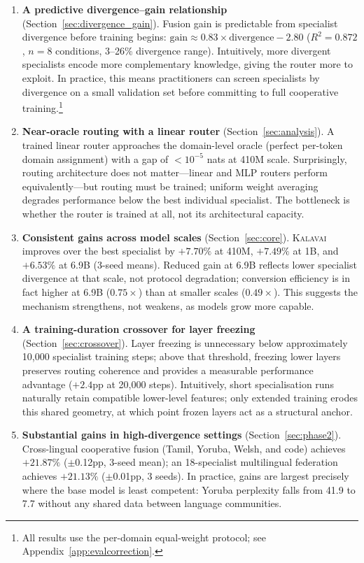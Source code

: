 \documentclass{article}
\newcommand{\kalavai}{\textsc{Kalavai}\xspace}
\begin{document}
\begin{enumerate}[leftmargin=*, itemsep=2pt]
\item \textbf{A predictive divergence--gain relationship} (Section~\ref{sec:divergence_gain}).
Fusion gain is predictable from specialist divergence before training begins:
$\text{gain} \approx 0.83 \times \text{divergence} - 2.80$
($R^2 = 0.872$, $n{=}8$ conditions, 3--26\% divergence range).
Intuitively, more divergent specialists encode more complementary knowledge,
giving the router more to exploit. In practice, this means practitioners can
screen specialists by divergence on a small validation set before committing
to full cooperative training.\footnote{All results use the per-domain equal-weight protocol; see Appendix~\ref{app:evalcorrection}.}

\item \textbf{Near-oracle routing with a linear router} (Section~\ref{sec:analysis}).
A trained linear router approaches the domain-level oracle (perfect per-token
domain assignment) with a gap of ${<}10^{-5}$ nats at 410M scale. Surprisingly,
routing architecture does not matter---linear and MLP routers perform
equivalently---but routing must be trained; uniform weight averaging degrades
performance below the best individual specialist. The bottleneck is whether the
router is trained at all, not its architectural capacity.

\item \textbf{Consistent gains across model scales} (Section~\ref{sec:core}).
\kalavai improves over the best specialist by $+7.70\%$ at 410M, $+7.49\%$ at
1B, and $+6.53\%$ at 6.9B (3-seed means). Reduced gain at 6.9B reflects lower
specialist divergence at that scale, not protocol degradation; conversion
efficiency is in fact higher at 6.9B ($0.75\times$) than at smaller scales
($0.49\times$). This suggests the mechanism strengthens, not weakens, as models
grow more capable.

\item \textbf{A training-duration crossover for layer freezing} (Section~\ref{sec:crossover}).
Layer freezing is unnecessary below approximately 10,000 specialist training
steps; above that threshold, freezing lower layers preserves routing coherence
and provides a measurable performance advantage ($+2.4$pp at 20,000 steps).
Intuitively, short specialisation runs naturally retain compatible lower-level
features; only extended training erodes this shared geometry, at which point
frozen layers act as a structural anchor.

\item \textbf{Substantial gains in high-divergence settings} (Section~\ref{sec:phase2}).
Cross-lingual cooperative fusion (Tamil, Yoruba, Welsh, and code) achieves
$+21.87\%$ ($\pm$0.12pp, 3-seed mean); an 18-specialist multilingual federation
achieves $+21.13\%$ ($\pm$0.01pp, 3 seeds). In practice, gains are largest
precisely where the base model is least competent: Yoruba perplexity falls from
41.9 to 7.7 without any shared data between language communities.
\end{enumerate}
\end{document}
